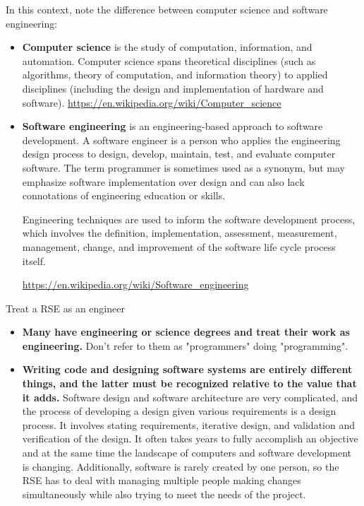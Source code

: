 \documentclass[]{nrel}
\begin{document}
\begin{appendices}
In this context, note the difference between computer science and software engineering:
\begin{itemize}
\item \textbf{Computer science} is the study of computation, information, and automation.
Computer science spans theoretical disciplines (such as algorithms, theory of computation,
and information theory) to applied disciplines (including the design and implementation of
hardware and software).
\url{https://en.wikipedia.org/wiki/Computer\_science}

\item \textbf{Software engineering} is an engineering-based approach to software development. A software
engineer is a person who applies the engineering design process to design, develop, maintain,
test, and evaluate computer software. The term programmer is sometimes used as a synonym,
but may emphasize software implementation over design and can also lack connotations of
engineering education or skills.

Engineering techniques are used to inform the software development process, which involves the
definition, implementation, assessment, measurement, management, change, and improvement of
the software life cycle process itself.

\url{https://en.wikipedia.org/wiki/Software\_engineering}

\end{itemize}

Treat a RSE as an engineer
\begin{itemize}
\item \textbf{Many have engineering or science degrees and treat their work as engineering.}
Don’t refer to them as "programmers" doing "programming".

\item \textbf{Writing code and designing software systems are entirely different things, and the latter must be recognized relative to the value that it adds.}
Software design and software architecture are very complicated, and the process of developing
a design given various requirements is a design process. It involves stating requirements,
iterative design, and validation and verification of the design. It often takes years to fully
accomplish an objective and at the same time the landscape of computers and software
development is changing. Additionally, software is rarely created by one person, so the RSE
has to deal with managing multiple people making changes simultaneously while also trying to
meet the needs of the project.


\end{itemize}
\end{appendices}
\end{document}
